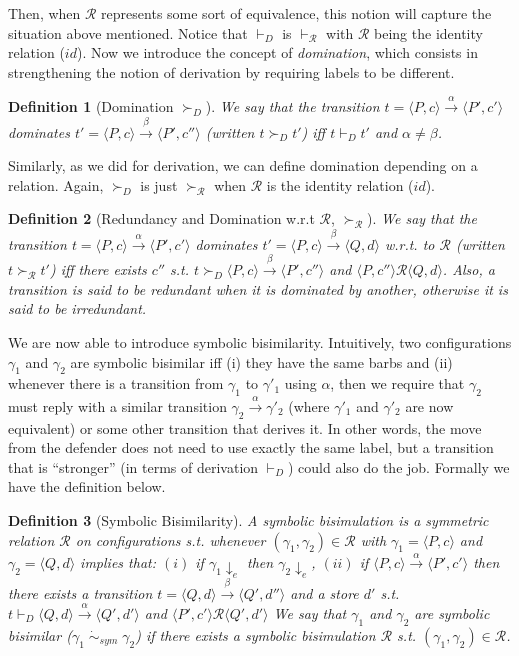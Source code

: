 \documentclass[copyright,creativecommons]{eptcs}
\newcommand{\rrarrow}{\longrightarrow}
\newcommand{\pairccp}[2]{\langle #1,#2 \rangle}
\newcommand{\trans}[1]{\stackrel{#1}{\rrarrow}}
\newtheorem{definition}{Definition}
\newcommand{\R}{\mathcal{R}}
\newcommand{\A}{\alpha}
\newcommand{\B}{\beta}
\newcommand{\G}{\gamma}
\newcommand{\conf}[2]{\pairccp{#1}{#2}}
\newcommand{\deriv}{\vdash_D}
\newcommand{\derivR}{\vdash_{\R}}
\newcommand{\dom}{\succ_D}
\newcommand{\domR}{\succ_{\R}}
\newcommand{\transition}[5]{\conf{#1}{#2} \trans{#3} \conf{#4}{#5}}
\newcommand{\idrel}{\mathit{id}}
\newcommand{\symbis}{\dot{\sim}_{sym}}
\begin{document}
Then, when $\R$ represents some sort of equivalence, this notion will
capture the situation above mentioned.
Notice that $\deriv$ is $\derivR$ with $\R$ being the identity relation ($\idrel$).
Now we introduce the concept of \emph{domination}, which consists in strengthening the
notion of derivation by requiring  labels to be different.

\begin{definition}[Domination $\dom$]
\label{def:dom}
We say that the transition $t = \transition{P}{c}{\A}{P'}{c'}$ dominates $t' = \transition{P}{c}{\B}{P'}{c''}$ (written $t \dom t'$) iff $t \deriv t'$ and $\A \neq \B$.
\end{definition}

Similarly, as we did for derivation, we can define domination
depending on a relation. Again, $\dom$ is just $\domR$ when
$\R$ is the identity relation ($\idrel$).

\begin{definition}[Redundancy and Domination w.r.t $\R$, $\domR$]
\label{def:domR}
We say that the transition $t = \transition{P}{c}{\A}{P'}{c'}$ dominates $t' = \transition{P}{c}{\B}{Q}{d}$ w.r.t. to $\R$ (written $t \domR t'$) iff there exists $c''$ s.t. $t \dom \transition{P}{c}{\B}{P'}{c''}$ and $\conf{P}{c''} \R \conf{Q}{d}$. Also, a transition is said to be redundant when it is dominated
by another, otherwise it is said to be irredundant.
\end{definition}

We are now able to introduce symbolic bisimilarity.
Intuitively, two configurations $\G_1$ and $\G_2$
are symbolic bisimilar iff (i) they have the same barbs and
(ii) whenever there is a transition from $\G_1$ to $\G'_1$ using $\A$, then
we require that $\G_2$ must reply with a similar transition $\G_2 \trans{\A} \G'_2$
(where $\G'_1$ and $\G'_2$ are now equivalent) or some other transition that derives it.
In other words, the move from the defender does not need to use exactly the same label,
but a transition that is ``stronger'' (in terms of derivation $\deriv$) could also do the job.
Formally we have the definition below.

\begin{definition}[Symbolic Bisimilarity]
\label{def:symbis}
A symbolic bisimulation is a symmetric relation
$\R$ on configurations s.t. whenever
$(\gamma_1, \gamma_2) \in \R$  with $\gamma_1=\conf{P}{c}$ and $\gamma_2=\conf{Q}{d}$ implies that:
$(i)$ if $\gamma_1 \downarrow_e$ then $\gamma_2 \downarrow_e$,
$(ii)$ if $\conf{P}{c} \trans{\A} \conf{P'}{c'}$ then there exists a transition $t = \transition{Q}{d}{\B}{Q'}{d''}$ and a store $d'$ s.t. $t \deriv \transition{Q}{d}{\A}{Q'}{d'}$ and $\conf{P'}{c'} \R \conf{Q'}{d'}$
We say that $\gamma_1$ and $\gamma_2$ are symbolic bisimilar ($\gamma_1  \; \symbis \; \gamma_2$) if there exists a symbolic bisimulation $\R$ s.t. $(\gamma_1,\gamma_2) \in \mathcal{R}$.
\end{definition}
\end{document}
